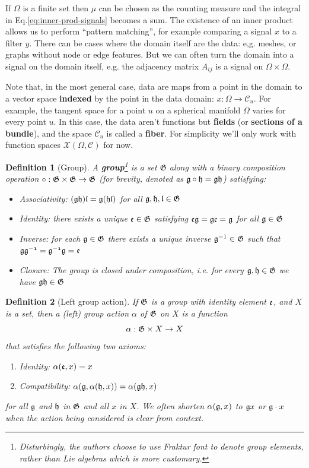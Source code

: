 \documentclass[11pt]{article}
\numberwithin{equation}{section}
\newtheorem{defn}{Definition}[section]
\begin{document}
If $\Omega$ is a finite set then $\mu$ can be chosen as the counting measure and the integral in Eq.\eqref{eq:inner-prod-signals} becomes a sum. The existence of an inner product allows us to perform ``pattern matching'', for example comparing a signal $x$ to a filter $y$. There can be cases where the domain itself are the data: e,g. meshes, or graphs without node or edge features. But we can often turn the domain into a signal on the domain itself, e.g. the adjacency matrix $A_{ij}$ is a signal on $\Omega \times \Omega$.

Note that, in the most general case, data are maps from a point in the domain to a vector space \textbf{indexed} by the point in the data domain: $x: \Omega \rightarrow \mathcal{C}_u$. For example, the tangent space for a point $u$ on a spherical manifold $\Omega$ varies for every point $u$. In this case, the data aren't functions but \textbf{fields} (or \textbf{sections of a bundle}), and the space $\mathcal{C}_u$ is called a \textbf{fiber}. For simplicity we'll only work with function spaces $\mathcal{X}(\Omega, \mathcal{C})$ for now.

\begin{defn}[Group]
A \textbf{group}\footnote{Disturbingly, the authors choose to use Fraktur font to denote group elements, rather than Lie algebras which is more customary.} is a set $\mathfrak{G}$ along with a binary composition operation $\circ: \mathfrak{G} \times \mathfrak{G} \rightarrow \mathfrak{G}$ (for brevity, denoted as $\mathfrak{g} \circ \mathfrak{h} = \mathfrak{g}\mathfrak{h}$) satisfying:
\begin{itemize}[noitemsep]
\item Associativity: $(\mathfrak{gh})\mathfrak{l} = \mathfrak{g}(\mathfrak{hl})$ for all $\mathfrak{g}, \mathfrak{h}, \mathfrak{l} \in \mathfrak{G}$
\item Identity: there exists a unique $\mathfrak{e} \in \mathfrak{G}$ satisfying $\mathfrak{eg} = \mathfrak{ge} = \mathfrak{g}$ for all $\mathfrak{g} \in \mathfrak{G}$
\item Inverse: for each $\mathfrak{g} \in \mathfrak{G}$ there exists a unique inverse $\mathfrak{g}^{-1} \in \mathfrak{G}$ such that $\mathfrak{g g^{-1}} = \mathfrak{g^{-1}g} = \mathfrak{e}$
\item Closure: The group is closed under composition, i.e. for every $\mathfrak{g}, \mathfrak{h} \in \mathfrak{G}$ we have $\mathfrak{gh} \in \mathfrak{G}$
\end{itemize}
\end{defn}

\begin{defn}[Left group action]
If $\mathfrak{G}$ is a group with identity element $\mathfrak{e}$, and $X$ is a set, then a (left) group action $\alpha$ of $\mathfrak{G}$ on $X$ is a function
\begin{equation}
\alpha : \mathfrak{G} \times X \rightarrow X
\end{equation}
that satisfies the following two axioms:
\begin{enumerate}[noitemsep]
\item Identity: $\alpha(\mathfrak{e}, x) = x$
\item Compatibility: $\alpha(\mathfrak{g}, \alpha(\mathfrak{h}, x)) = \alpha(\mathfrak{gh}, x)$
\end{enumerate}
for all $\mathfrak{g}$ and $\mathfrak{h}$ in $\mathfrak{G}$ and all $x$ in $X$. We often shorten $\alpha(\mathfrak{g}, x)$ to $\mathfrak{g}x$ or $\mathfrak{g}\cdot x$ when the action being considered is clear from context.
\end{defn}
\end{document}
